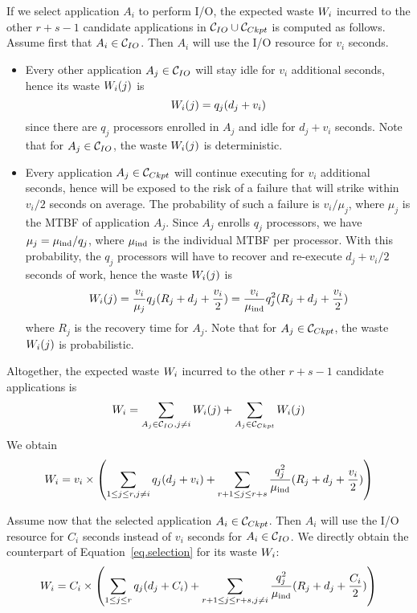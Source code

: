 If we select application $A_{i}$ to perform I/O,  the expected waste $W_{i}$ incurred
to the other $r+s-1$ candidate applications in  $\mathcal{C}_{IO} \cup \mathcal{C}_{Ckpt}$ is computed as follows.
Assume first that $A_{i} \in \mathcal{C}_{IO}$. Then  $A_{i}$ will use the I/O resource for $v_{i}$ seconds.
\begin{itemize}
  \item Every other application $A_{j} \in \mathcal{C}_{IO}$ will stay idle for $v_{i}$ additional seconds,
  hence its waste $W_{i}(j)$ is
  $$W_{i}(j) = q_{j} (d_{j} + v_{i})$$
  since there are $q_{j}$ processors enrolled in $A_{j}$ and idle for $d_{j} + v_{i}$ seconds. Note that for $A_{j} \in \mathcal{C}_{IO}$, the waste $W_{i}(j)$ is deterministic.
  \item Every application $A_{j} \in \mathcal{C}_{Ckpt}$ will continue executing for $v_{i}$ additional seconds, hence will be exposed to the risk of a failure that will strike within $v_{i}/2$ seconds on average. The probability of such a failure is $v_{i}/\mu_{j}$, where $\mu_{j}$ is the
  MTBF of application $A_{j}$. Since $A_{j}$ enrolls $q_{j}$ processors, we have $\mu_{j} = \mu_{\text{ind}}/q_{j}$, where $\mu_{\text{ind}}$ is the individual MTBF per processor. With this probability,
  the $q_{j}$ processors will have to recover and re-execute $d_{j} + v_{i}/2$ seconds of work,
  hence the waste $W_{i}(j)$ is
     $$W_{i}(j) = \frac{v_{i}}{\mu_{j} } q_{j} (R_{j} + d_{j} + \frac{v_{i}}{2}) =
     \frac{v_{i}}{\mu_{\text{ind}}} q^{2}_{j} (R_{j} + d_{j} + \frac{v_{i}}{2})$$
     where $R_{j}$ is the recovery time for $A_{j}$.
Note that for $A_{j} \in \mathcal{C}_{Ckpt}$, the waste $W_{i}(j)$ is probabilistic.
 \end{itemize}
 Altogether, the expected waste $W_{i}$ incurred
to the other $r+s-1$ candidate applications is
$$W_{i} = \sum_{A_{j} \in \mathcal{C}_{IO}, j\neq i} W_{i}(j) + \sum_{A_{j} \in \mathcal{C}_{Ckpt}} W_{i}(j)$$
We obtain
\begin{equation}
\label{eq.selection}
 W_{i} = v_{i} \times \left( \sum_{1 \leq j \leq r, j\neq i} q_{j} (d_{j} + v_{i})
 + \sum_{r+1 \leq j \leq r+s}   \frac{q^{2}_{j}}{\mu_{\text{ind}}} (R_{j} + d_{j} + \frac{v_{i}}{2}) \right)
\end{equation}

 Assume now that the selected application $A_{i} \in \mathcal{C}_{Ckpt}$. Then  $A_{i}$ will use the I/O resource for $C_{i}$ seconds instead of $v_{i}$ seconds for $A_{i} \in \mathcal{C}_{IO}$. We directly obtain the counterpart of Equation~\eqref{eq.selection} for its waste $W_{i}$:
 \begin{equation}
\label{eq.selection2}
 W_{i} = C_{i} \times \left( \sum_{1 \leq j \leq r} q_{j} (d_{j} + C_{i})
 + \sum_{r+1 \leq j \leq r+s, j\neq i}   \frac{q^{2}_{j}}{\mu_{\text{ind}}} (R_{j} + d_{j} + \frac{C_{i}}{2}) \right)
\end{equation}


